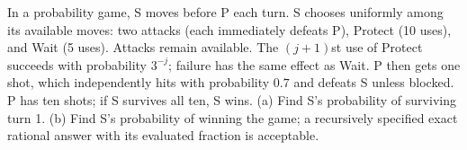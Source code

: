 In a probability game, S moves before P each turn. S chooses uniformly among its available moves: two attacks (each immediately defeats P), Protect (10 uses), and Wait (5 uses). Attacks remain available. The $(j+1)$st use of Protect succeeds with probability $3^{-j}$; failure has the same effect as Wait. P then gets one shot, which independently hits with probability $0.7$ and defeats S unless blocked. P has ten shots; if S survives all ten, S wins. (a) Find S's probability of surviving turn 1. (b) Find S's probability of winning the game; a recursively specified exact rational answer with its evaluated fraction is acceptable.
